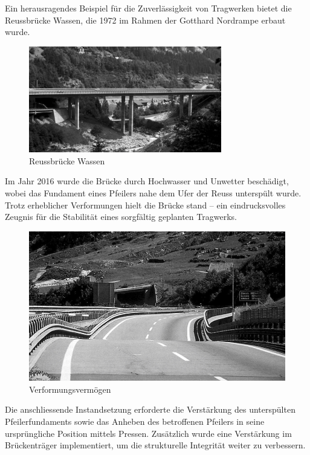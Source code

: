 Ein herausragendes Beispiel für die Zuverlässigkeit von Tragwerken bietet die Reussbrücke Wassen, die 1972 im Rahmen der Gotthard Nordrampe erbaut wurde. 
\begin{figure} [h]
	\centering
	\includegraphics[width=0.75\textwidth]{papers/balken/images/teil3/ReussbrueckeWassen1.jpg}
	\caption{Reussbrücke Wassen}
	\label{fig:Reussbrücke-Wassen}
\end{figure}
Im Jahr 2016 wurde die Brücke durch Hochwasser und Unwetter beschädigt, wobei das Fundament eines Pfeilers nahe dem Ufer der Reuss unterspült wurde. 
Trotz erheblicher Verformungen hielt die Brücke stand – ein eindrucksvolles Zeugnis für die Stabilität eines sorgfältig geplanten Tragwerks.
\begin{figure}
\begin{center}
\includegraphics[width=\textwidth]{papers/balken/images/teil3/ReussbrueckeWassen2.jpg}
\end{center}
\caption{Verformungsvermögen}
\end{figure}
Die anschliessende Instandsetzung erforderte die Verstärkung des unterspülten Pfeilerfundaments sowie das Anheben des betroffenen Pfeilers in seine ursprüngliche Position mittels Pressen. 
Zusätzlich wurde eine Verstärkung im Brückenträger implementiert, um die strukturelle Integrität weiter zu verbessern. 
